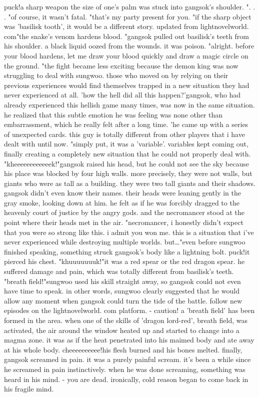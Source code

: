 puck!a sharp weapon the size of one's palm was stuck into gangsok's shoulder.
".
.
.
"of course, it wasn't fatal.
 "that's my party present for you.
"if the sharp object was 'basilisk tooth', it would be a different story.
updated from lightnov‌elworld.
c‌om"the snake's venom hardens blood.
"gangsok pulled out basilisk's teeth from his shoulder.
 a black liquid oozed from the wounds.
 it was poison.
"alright.
 before your blood hardens, let me draw your blood quickly and draw a magic circle on the ground.
"the fight became less exciting because the demon king was now struggling to deal with sungwoo.
those who moved on by relying on their previous experiences would find themselves trapped in a new situation they had never experienced at all.
'how the hell did all this happen?'gangsok, who had already experienced this hellish game many times, was now in the same situation.
 he realized that this subtle emotion he was feeling was none other than embarrassment, which he really felt after a long time.
'he came up with a series of unexpected cards.
 this guy is totally different from other players that i have dealt with until now.
"simply put, it was a 'variable'.
variables kept coming out, finally creating a completely new situation that he could not properly deal with.
"kheeeeeeeeeeeek!"gangsok raised his head, but he could not see the sky because his place was blocked by four high walls.
 more precisely, they were not walls, but giants who were as tall as a building.
 they were two tall giants and their shadows.
gangsok didn't even know their names.
 their heads were leaning gently in the gray smoke, looking down at him.
 he felt as if he was forcibly dragged to the heavenly court of justice by the angry gods.
and the necromancer stood at the point where their heads met in the air.
 "necromancer, i honestly didn't expect that you were so strong like this.
 i admit you won me.
 this is a situation that i've never experienced while destroying multiple worlds.
 but…"even before sungwoo finished speaking, something struck gangsok's body like a lightning bolt.
puck!it pierced his chest.
"khuuuuuuuk!"it was a red spear or the red dragon spear.
 he suffered damage and pain, which was totally different from basilisk's teeth.
"breath field!"sungwoo used his skill straight away, so gangsok could not even have time to speak.
in other words, sungwoo clearly suggested that he would allow any moment when gangsok could turn the tide of the battle.
follow new episodes on the lightnovelworld.
com platform.
- caution! a 'breath field' has been formed in the area.
when one of the skills of 'dragon lord-red', breath field, was activated, the air around the window heated up and started to change into a magma zone.
 it was as if the heat penetrated into his maimed body and ate away at his whole body.
cheeeeeeeeee!his flesh burned and his bones melted.
finally, gangsok screamed in pain.
 it was a purely painful scream.
it's been a while since he screamed in pain instinctively.
when he was done screaming, something was heard in his mind.
- you are dead.
ironically, cold reason began to come back in his fragile mind.
 

